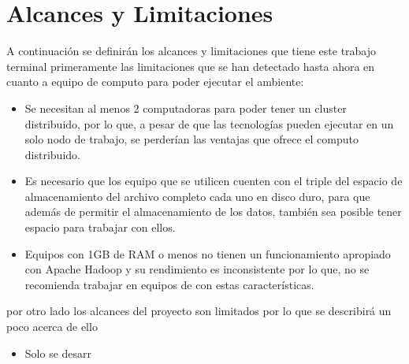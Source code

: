 \section{Alcances y Limitaciones}
A continuación se definirán los alcances y limitaciones que tiene este trabajo terminal 
primeramente las limitaciones que se han detectado hasta ahora en cuanto a equipo de computo para poder ejecutar el ambiente:
\begin{itemize}
	\item Se necesitan al menos 2 computadoras para poder tener un cluster distribuido, por lo que, a pesar de que las tecnologías pueden ejecutar en un solo nodo de trabajo, se perderían las ventajas que ofrece el computo distribuido.
	\item Es necesario que los equipo que se utilicen cuenten con el triple del espacio de almacenamiento del archivo completo cada uno en disco duro, para que además de permitir el almacenamiento de los datos, también sea posible tener espacio para trabajar con ellos.
	\item Equipos con 1GB de RAM o menos no tienen un funcionamiento apropiado con Apache Hadoop y su rendimiento es inconsistente por lo que, no se recomienda trabajar en equipos de con estas características.  
\end{itemize}
por otro lado los alcances del proyecto son limitados por lo que se describirá un poco acerca de ello
\begin{itemize}
	\item Solo se desarr
\end{itemize}